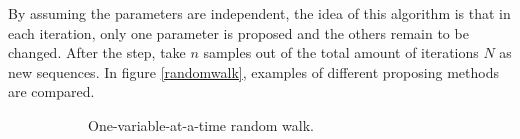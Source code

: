 By assuming the parameters are independent, the idea of this algorithm is that in each iteration, only one parameter is proposed and the others remain to be changed. After the step, take $n$ samples out of the total amount of iterations $N$ as new sequences. In figure \ref{randomwalk}, examples of different proposing methods are compared. 
\begin{figure}[h]
\centering
 \begin{subfigure}[b]{0.32\textwidth}
  \caption{\footnotesize One-variable-at-a-time random walk.}\label{MCMConevariableRW}
\end{subfigure}
\begin{subfigure}[b]{0.32\textwidth}
\end{subfigure}
\end{figure}
